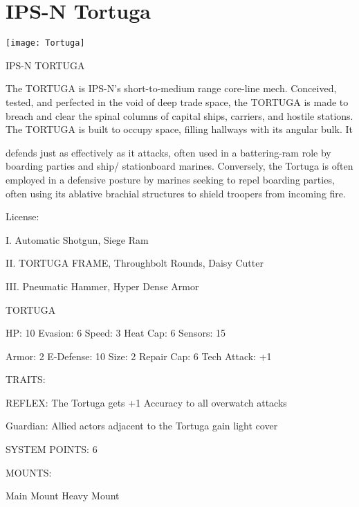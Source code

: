 \section{IPS-N Tortuga}

\centering\texttt{[image: Tortuga]}

                                                   IPS-N TORTUGA

The TORTUGA is IPS-N’s short-to-medium range core-line mech. Conceived, tested, and perfected in the
void of deep trade space, the TORTUGA is made to breach and clear the spinal columns of capital ships,
carriers, and hostile stations. The TORTUGA is built to occupy space, filling hallways with its angular bulk. It




defends just as effectively as it attacks, often used in a battering-ram role by boarding parties and ship/
stationboard marines. Conversely, the Tortuga is often employed in a defensive posture by marines seeking
to repel boarding parties, often using its ablative brachial structures to shield troopers from incoming fire.

                                                   License:

I. Automatic Shotgun, Siege Ram

II. TORTUGA FRAME, Throughbolt Rounds, Daisy Cutter

III. Pneumatic Hammer, Hyper Dense Armor


                                                 TORTUGA

  HP: 10         Evasion: 6                            Speed: 3           Heat Cap: 6        Sensors: 15

  Armor: 2       E-Defense: 10                         Size: 2            Repair Cap: 6      Tech Attack:
                                                                                             +1

                                                   TRAITS:

  REFLEX: The Tortuga gets +1 Accuracy to all overwatch attacks

  Guardian: Allied actors adjacent to the Tortuga gain light cover

                                             SYSTEM POINTS: 6

                                                   MOUNTS:

  Main Mount                        Heavy Mount

